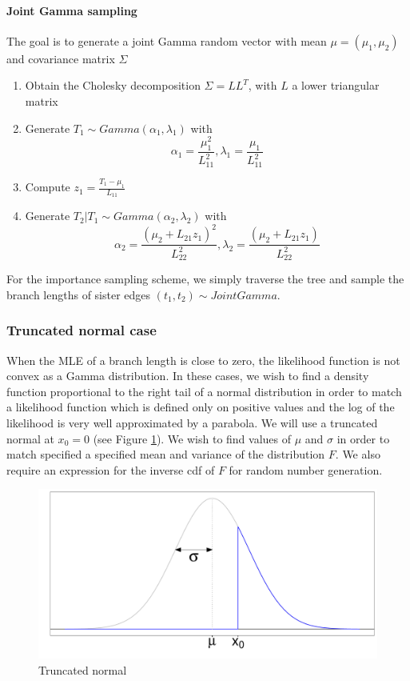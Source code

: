 \documentclass[useAMS,usenatbib]{biom}
\begin{document}
\paragraph{Joint Gamma sampling} The goal is to generate a joint Gamma
random vector with mean $\mu=(\mu_1, \mu_2)$ and covariance matrix
$\Sigma$
\begin{enumerate}
\item{Obtain the Cholesky decomposition $\Sigma=LL^T$, with $L$ a
    lower triangular matrix}
\item{Generate $T_1 \sim Gamma(\alpha_1, \lambda_1)$ with
\begin{equation}
\alpha_1 = \frac{\mu_1^2}{L_{11}^2},  \lambda_1 = \frac{\mu_1}{L_{11}^2}
\end{equation}}
\item{Compute $z_1 = \frac{T_1-\mu_1}{L_{11}}$}
\vspace{0.25cm}
\item{Generate $T_2|T_1 \sim Gamma(\alpha_2, \lambda_2)$ with
\begin{equation}
\alpha_2 = \frac{(\mu_2+L_{21}z_1)^2}{L_{22}^2}, \lambda_2 = \frac{(\mu_2+L_{21}z_1)}{L_{22}^2}
\end{equation}}
\end{enumerate}

For the importance sampling scheme, we simply traverse the tree and
sample the branch lengths of sister edges $(t_1,t_2) \sim Joint
Gamma$.

\subsubsection{Truncated normal case}
When the MLE of a branch length is close to zero, the likelihood
function is not convex as a Gamma distribution.  In these cases, we
wish to find a density function proportional to the right tail of a
normal distribution in order to match a likelihood function which is
defined only on positive values and the log of the likelihood is very
well approximated by a parabola. We will use a truncated normal at
$x_0=0$ (see Figure \ref{trun-norm}). We wish to find values of $\mu$
and $\sigma$ in order to match specified a specified mean and variance
of the distribution $F$.  We also require an expression for the
inverse cdf of $F$ for random number generation.
\begin{figure}
\centering
\includegraphics[scale=0.35]{figures/truncated-normal.pdf}
\caption{Truncated normal}
\label{trun-norm}
\end{figure}
\end{document}
